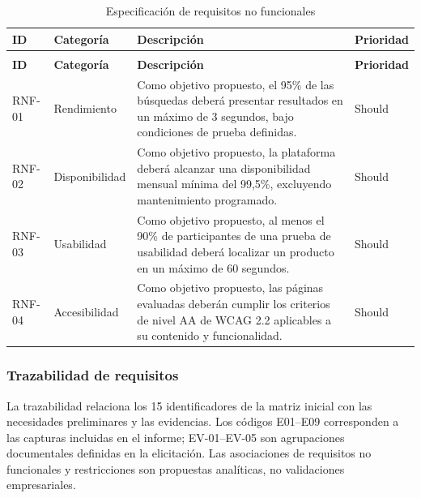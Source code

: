\documentclass[12pt,a4paper]{article}
\renewcommand{\arraystretch}{1.17}
\begin{document}
\begingroup
\footnotesize
\setlength{\tabcolsep}{3pt}
\renewcommand{\arraystretch}{1.22}
\begin{longtable}{|>{\raggedright\arraybackslash}p{1.4cm}|>{\raggedright\arraybackslash}p{2.5cm}|>{\raggedright\arraybackslash}p{8.65cm}|>{\raggedright\arraybackslash}p{1.45cm}|}
\caption{Especificación de requisitos no funcionales}\\
\hline
\textbf{ID} & \textbf{Categoría} & \textbf{Descripción} & \textbf{Prioridad} \\
\hline
\endfirsthead
\multicolumn{4}{c}{\textit{Continuación: Especificación de requisitos no funcionales}}\\
\hline
\textbf{ID} & \textbf{Categoría} & \textbf{Descripción} & \textbf{Prioridad} \\
\hline
\endhead
RNF-01 & Rendimiento & Como objetivo propuesto, el 95\% de las búsquedas deberá presentar resultados en un máximo de 3 segundos, bajo condiciones de prueba definidas. & Should \\
\hline
RNF-02 & Disponibilidad & Como objetivo propuesto, la plataforma deberá alcanzar una disponibilidad mensual mínima del 99,5\%, excluyendo mantenimiento programado. & Should \\
\hline
RNF-03 & Usabilidad & Como objetivo propuesto, al menos el 90\% de participantes de una prueba de usabilidad deberá localizar un producto en un máximo de 60 segundos. & Should \\
\hline
RNF-04 & Accesibilidad & Como objetivo propuesto, las páginas evaluadas deberán cumplir los criterios de nivel AA de WCAG 2.2 aplicables a su contenido y funcionalidad. & Should \\
\hline
\end{longtable}
\endgroup

\subsubsection{Trazabilidad de requisitos}
La trazabilidad relaciona los 15 identificadores de la matriz inicial con las necesidades preliminares y las evidencias. Los códigos E01--E09 corresponden a las capturas incluidas en el informe; EV-01--EV-05 son agrupaciones documentales definidas en la elicitación. Las asociaciones de requisitos no funcionales y restricciones son propuestas analíticas, no validaciones empresariales.
\end{document}
